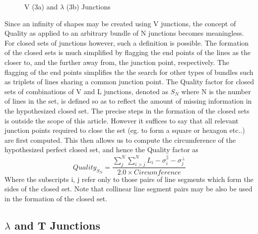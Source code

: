 \begin{figure}[htbp]
\vspace*{-10mm}
\vspace*{6cm}
\vspace*{-5mm}
\caption{V (3a) and $\lambda$ (3b) Junctions}
\label{fig:junction}
\end{figure}

 Since an infinity of shapes may be created using V junctions, the concept of 
Quality as applied to an arbitrary bundle of N junctions becomes meaningless. 
For closed sets of junctions however, such a definition is possible. The 
formation of the closed sets is much simplified by flagging the end points 
of the lines as the closer to, and the further away from, the junction point, 
respectively. The flagging of the end points simplifies the the search for 
other types of bundles such as triplets of lines sharing a common junction 
point. The Quality factor for closed sets of combinations of V and L 
junctions, denoted as $S_{N}$ where N is the number of lines in the set, is 
defined so as to reflect the amount of missing information in the hypothesized 
closed set. The precise steps in the formation of the closed sets is outside
the scope of this article. However it suffices to say that all relevant
junction points required to close the set (eg. to form a square or hexagon 
etc..) are first computed. This then allows us to compute the circumference of 
the hypothesized perfect closed set, and hence the Quality factor as 
\vspace{-2mm}
\begin{equation}
 Quality_{S_{N}} = 
\frac { \sum^{N}_{j}\sum^{N}_{i>j} L_{i}  - \sigma^{\parallel}_{i} - \sigma^{\perp}_{j}}
{
2.0 \times Circumference
}
\end{equation}
\vspace{-1mm}
 Where the subscripts i, j refer only to those pairs of line segments which
form the sides of the closed set. Note that collinear line segment pairs may be
also be used in the formation of the closed set. 

\subsection{$\lambda$ and T Junctions}
 

